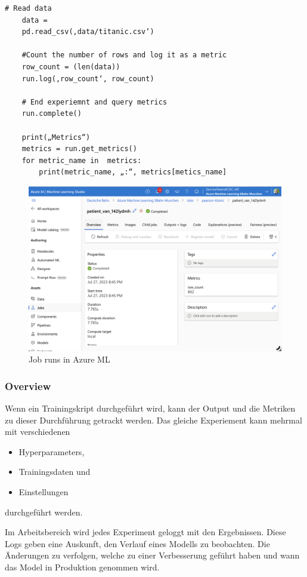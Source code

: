 \begin{lstlisting}[style=Python]
	# Read data
	data = 
	pd.read_csv(‚data/titanic.csv‘)
	
	#Count the number of rows and log it as a metric
	row_count = (len(data))
	run.log(‚row_count‘, row_count)
	
	# End experiemnt and query metrics
	run.complete()
	
	print(„Metrics“)
	metrics = run.get_metrics()
	for metric_name in  metrics:
		print(metric_name, „:“, metrics[metics_name]
\end{lstlisting}

\begin{figure}[H]
 	\centering 	\includegraphics[scale = 0.3]{attachment/chapter_10/Scc051}
 	\caption{Job runs in Azure ML}
\end{figure}


\subsubsection{Overview}

Wenn ein Trainingskript durchgeführt wird, kann der Output und die Metriken zu dieser Durchführung getrackt werden. Das gleiche Experiement kann mehrmal mit verschiedenen 
\begin{itemize}
	\item Hyperparameters,
	\item Trainingsdaten und
	\item Einstellungen 
\end{itemize}
durchgeführt werden. 

Im Arbeitsbereich wird jedes Experiment geloggt mit den Ergebnissen. Diese Logs geben eine Auskunft, den Verlauf eines Modells zu beobachten. Die Änderungen zu verfolgen, welche zu einer Verbesserung geführt haben und wann das Model in Produktion genommen wird.




